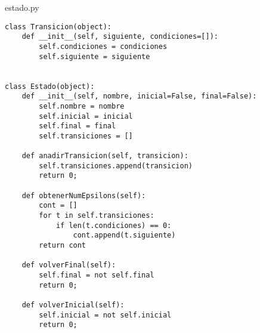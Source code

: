 estado.py
\lstset{language=Python, breaklines=true, basicstyle=\footnotesize}
\begin{lstlisting}[frame=single]
class Transicion(object):
    def __init__(self, siguiente, condiciones=[]):
        self.condiciones = condiciones
        self.siguiente = siguiente


class Estado(object):
    def __init__(self, nombre, inicial=False, final=False):
        self.nombre = nombre
        self.inicial = inicial
        self.final = final
        self.transiciones = []

    def anadirTransicion(self, transicion):
        self.transiciones.append(transicion)
        return 0;

    def obtenerNumEpsilons(self):
        cont = []
        for t in self.transiciones:
            if len(t.condiciones) == 0:
                cont.append(t.siguiente)
        return cont

    def volverFinal(self):
        self.final = not self.final
        return 0;

    def volverInicial(self):
        self.inicial = not self.inicial
        return 0;
\end{lstlisting}
